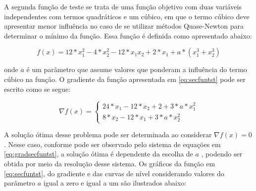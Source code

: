 A segunda função de teste se trata de uma função objetivo com duas variáveis independentes com termos quadráticos e um cúbico, em que o termo cúbico deve apresentar menor influência no caso de se utilizar métodos Quase-Newton para determinar o mínimo da função. Essa função é definida como apresentado abaixo:

\begin{equation}\label{eq:secfuntst}
  f(x) = 12*x_1^2 - 4*x_2^2 - 12*x_1x_2 + 2*x_1 + a*(x_1^3+x_2^3)
\end{equation}

onde $a$ é um parâmetro que assume valores que ponderam a influência do termo cúbico na função. O gradiente da função apresentada em \ref{eq:secfuntst} pode ser escrito como se segue:

\begin{equation}\label{eq:gradsecfuntst}
    \nabla f(x) = \begin{cases}
        24*x_1-12*x_2+2+3*a*x_1^2\\
       8*x_2-12*x_1+3*a*x_2^2
    \end{cases}
\end{equation}

A solução ótima desse problema pode ser determinada ao considerar $\nabla f(x)=0$. Nesse caso, conforme pode ser observado pelo sistema de equações em \ref{eq:gradsecfuntst}, a solução ótima é dependente da escolha de $a$ , podendo ser obtida por meio da resolução desse sistema.
Os gráficos da função em \ref{eq:secfuntst}, do gradiente e das curvas de nível considerando valores do parâmetro $a$ igual a zero e igual a um são ilustrados abaixo:

